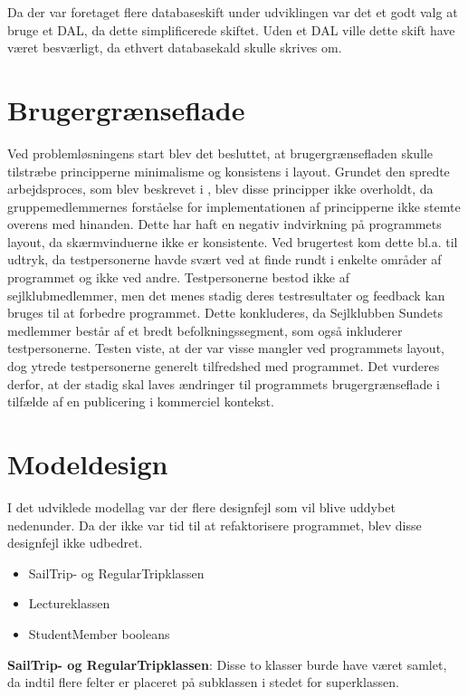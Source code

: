 Da der var foretaget flere databaseskift under udviklingen var det et godt valg at bruge et \acl{DAL}, da dette simplificerede skiftet. 
Uden et \ac{DAL} ville dette skift have været besværligt, da ethvert databasekald skulle skrives om. 

\section*{Brugergrænseflade}

Ved problemløsningens start blev det besluttet, at brugergrænsefladen skulle tilstræbe principperne minimalisme og konsistens i layout.
Grundet den spredte arbejdsproces, som blev beskrevet i , blev disse principper ikke overholdt, da gruppemedlemmernes forståelse for implementationen af principperne ikke stemte overens med hinanden.
Dette har haft en negativ indvirkning på programmets layout, da skærmvinduerne ikke er konsistente.
Ved brugertest kom dette bl.a. til udtryk, da testpersonerne havde svært ved at finde rundt i enkelte områder af programmet og ikke ved andre. 
Testpersonerne bestod ikke af sejlklubmedlemmer, men det menes stadig deres testresultater og feedback kan bruges til at forbedre programmet.
Dette konkluderes, da Sejlklubben Sundets medlemmer består af et bredt befolkningssegment, som også inkluderer testpersonerne. 
Testen viste, at der var visse mangler ved programmets layout, dog ytrede testpersonerne generelt tilfredshed med programmet.
Det vurderes derfor, at der stadig skal laves ændringer til programmets brugergrænseflade i tilfælde af en publicering i kommerciel kontekst. 

\section*{Modeldesign}
I det udviklede modellag var der flere designfejl som vil blive uddybet nedenunder. 
Da der ikke var tid til at refaktorisere programmet, blev disse designfejl ikke udbedret. 
\begin{itemize}
	\item SailTrip- og RegularTripklassen
	\item Lectureklassen
	\item StudentMember booleans
\end{itemize}

\textbf{SailTrip- og RegularTripklassen}: 
Disse to klasser burde have været samlet, da indtil flere felter er placeret på subklassen i stedet for superklassen. 

